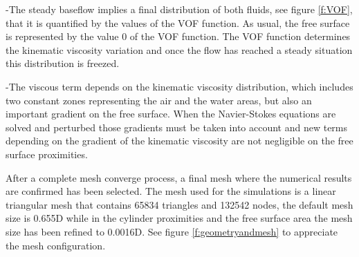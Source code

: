 \documentclass[%
 reprint,
 amsmath,amssymb,
 aps,
prl
]{revtex4-1}
\begin{document}
-The steady baseflow implies a final distribution of both fluids, see figure \ref{f:VOF}, that it is quantified by the values of the VOF function. As usual, the free surface is represented by the value 0 of the VOF function. The VOF function determines the kinematic viscosity variation and once the flow has reached a steady situation this distribution is freezed.

-The viscous term depends on the kinematic viscosity distribution, which includes two constant zones representing the air and the water areas, but also an important gradient on the free surface. When the Navier-Stokes equations are solved and perturbed those gradients must be taken into account and new terms depending on the gradient of the kinematic viscosity are not negligible on the free surface proximities.


After a complete mesh converge process, a final mesh where the numerical results are confirmed has been selected. The mesh used for the simulations is a linear triangular mesh that contains 65834 triangles and 132542 nodes, the default mesh size is 0.655D while in the cylinder proximities and the free surface area the mesh size has been refined to 0.0016D. See figure \ref{f:geometryandmesh} to appreciate the mesh configuration.
\end{document}

